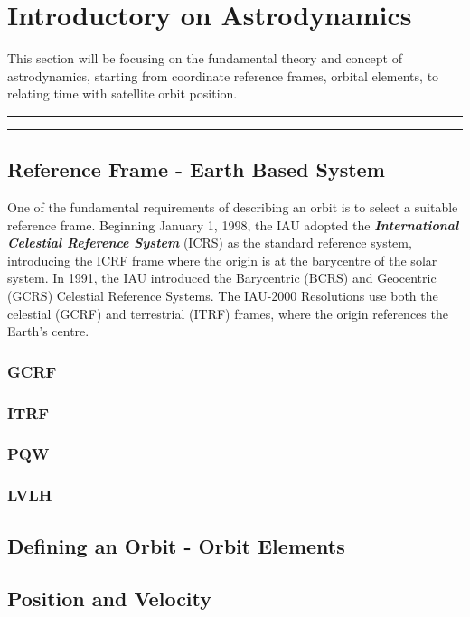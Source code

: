 

\section{Introductory on Astrodynamics}
This section will be focusing on the fundamental theory and concept of astrodynamics, starting from coordinate reference frames, orbital elements, to relating time with satellite orbit position. 
\vspace{0.3cm}
\hrule\vspace{0.1cm}
\hrule
\vspace{0.3cm}
\begin{multicols}{2}


\subsection{Reference Frame - Earth Based System}
One of the fundamental requirements of describing an orbit is to select a suitable reference frame. Beginning January 1, 1998, the IAU adopted the \textbf{\textit{International Celestial Reference System}} (ICRS) as the standard reference system, introducing the ICRF frame where the origin is at the barycentre of the solar system. In 1991, the IAU introduced the Barycentric (BCRS) and Geocentric (GCRS) Celestial Reference Systems. The IAU-2000 Resolutions use both the celestial (GCRF) and terrestrial (ITRF) frames, where the origin references the Earth's centre.

\subsubsection{GCRF}

\subsubsection{ITRF}

\subsubsection{PQW}

\subsubsection{LVLH}

\subsection{Defining an Orbit - Orbit Elements}

\subsection{Position and Velocity}


\end{multicols}
